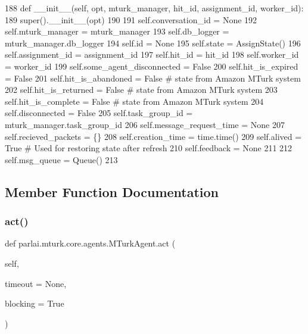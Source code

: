 \begin{DoxyCode}
188     \textcolor{keyword}{def }\_\_init\_\_(self, opt, mturk\_manager, hit\_id, assignment\_id, worker\_id):
189         super().\_\_init\_\_(opt)
190 
191         self.conversation\_id = \textcolor{keywordtype}{None}
192         self.mturk\_manager = mturk\_manager
193         self.db\_logger = mturk\_manager.db\_logger
194         self.id = \textcolor{keywordtype}{None}
195         self.state = AssignState()
196         self.assignment\_id = assignment\_id
197         self.hit\_id = hit\_id
198         self.worker\_id = worker\_id
199         self.some\_agent\_disconnected = \textcolor{keyword}{False}
200         self.hit\_is\_expired = \textcolor{keyword}{False}
201         self.hit\_is\_abandoned = \textcolor{keyword}{False}  \textcolor{comment}{# state from Amazon MTurk system}
202         self.hit\_is\_returned = \textcolor{keyword}{False}  \textcolor{comment}{# state from Amazon MTurk system}
203         self.hit\_is\_complete = \textcolor{keyword}{False}  \textcolor{comment}{# state from Amazon MTurk system}
204         self.disconnected = \textcolor{keyword}{False}
205         self.task\_group\_id = mturk\_manager.task\_group\_id
206         self.message\_request\_time = \textcolor{keywordtype}{None}
207         self.recieved\_packets = \{\}
208         self.creation\_time = time.time()
209         self.alived = \textcolor{keyword}{True}  \textcolor{comment}{# Used for restoring state after refresh}
210         self.feedback = \textcolor{keywordtype}{None}
211 
212         self.msg\_queue = Queue()
213 
\end{DoxyCode}


\subsection{Member Function Documentation}
\mbox{\label{classparlai_1_1mturk_1_1core_1_1agents_1_1MTurkAgent_ace5f52c7d5532def64ed17737d2ce00c}} 
\subsubsection{\texorpdfstring{act()}{act()}}
{\footnotesize\ttfamily def parlai.\+mturk.\+core.\+agents.\+M\+Turk\+Agent.\+act (\begin{DoxyParamCaption}\item[{}]{self,  }\item[{}]{timeout = {\ttfamily None},  }\item[{}]{blocking = {\ttfamily True} }\end{DoxyParamCaption})}

